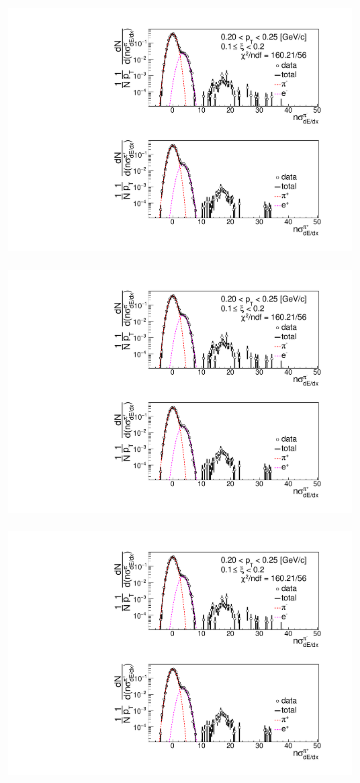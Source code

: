 \begin{figure}[h!]
	\centering
	\begin{subfigure}{.33\textwidth}
		\includegraphics[width=\linewidth, page=1]{chapters/chrgSTAR/img/dEdx/fit2019_secondStep_0_2.pdf}
	\end{subfigure}
	\begin{subfigure}{.33\textwidth}
		\includegraphics[width=\linewidth, page=2]{chapters/chrgSTAR/img/dEdx/fit2019_secondStep_0_2.pdf}
	\end{subfigure}
	\begin{subfigure}{.3\textwidth}
		\includegraphics[width=\linewidth, page=3]{chapters/chrgSTAR/img/dEdx/fit2019_secondStep_0_2.pdf}

\end{subfigure}
\end{figure}
